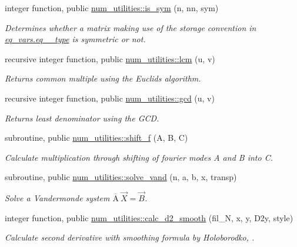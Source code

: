 \begin{DoxyCompactItemize}
integer function, public \hyperlink{namespacenum__utilities_a4e6994b5c92b3d16c8538b54db0beadd}{num\+\_\+utilities\+::is\+\_\+sym} (n, nn, sym)
\begin{DoxyCompactList}\small\item\em Determines whether a matrix making use of the storage convention in \hyperlink{structeq__vars_1_1eq__2__type}{eq\+\_\+vars.\+eq\+\_\+\_\+type} is symmetric or not. \end{DoxyCompactList}\item 
recursive integer function, public \hyperlink{namespacenum__utilities_a33fc1483c840d5d3f9b12acfce21cad1}{num\+\_\+utilities\+::lcm} (u, v)
\begin{DoxyCompactList}\small\item\em Returns common multiple using the Euclid\textquotesingle{}s algorithm. \end{DoxyCompactList}\item 
recursive integer function, public \hyperlink{namespacenum__utilities_a3d0d04a582b3a528fc7f9975d5d2a807}{num\+\_\+utilities\+::gcd} (u, v)
\begin{DoxyCompactList}\small\item\em Returns least denominator using the G\+CD. \end{DoxyCompactList}\item 
subroutine, public \hyperlink{namespacenum__utilities_a859f442a1b860d82662eed17c4374c38}{num\+\_\+utilities\+::shift\+\_\+f} (A, B, C)
\begin{DoxyCompactList}\small\item\em Calculate multiplication through shifting of fourier modes A and B into C. \end{DoxyCompactList}\item 
subroutine, public \hyperlink{namespacenum__utilities_a54c65e345182e2e7e13ac14a0ba3647a}{num\+\_\+utilities\+::solve\+\_\+vand} (n, a, b, x, transp)
\begin{DoxyCompactList}\small\item\em Solve a Vandermonde system $\overline{\text{A}} \ \vec{X} = \vec{B}$. \end{DoxyCompactList}\item 
integer function, public \hyperlink{namespacenum__utilities_ab4c91a6478c4dd6f519f8ccbccc4094f}{num\+\_\+utilities\+::calc\+\_\+d2\+\_\+smooth} (fil\+\_\+N, x, y, D2y, style)
\begin{DoxyCompactList}\small\item\em Calculate second derivative with smoothing formula by Holoborodko, \cite{holoborodko2008diff}. \end{DoxyCompactList}\end{DoxyCompactItemize}
